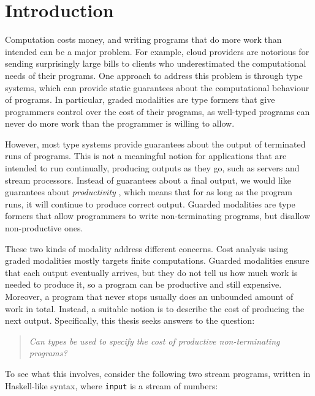 \chapter{Introduction}\label{chap:Introduction}
Computation costs money, and writing programs that do more work than intended can be a major problem. For example, cloud providers are
notorious for sending surprisingly large bills to clients who underestimated the computational needs of their programs.
One approach to address this problem is through type systems, which can provide static guarantees about the computational behaviour of programs.
In particular, graded modalities \citep{katsumata14, orchardQuantitativeProgramReasoning2019a} are type formers that give
programmers control over the cost of their programs, as well-typed programs can never do more work than the programmer is willing to allow.

However, most type systems provide guarantees about the output of terminated runs of programs. This is not a meaningful notion for
applications that are intended to run continually, producing outputs as they go, such as servers and stream processors.
Instead of guarantees about a final output, we would like guarantees about \emph{productivity} \citep{atkeyProductiveCoprogrammingGuarded2013a},
which means that for as long as the program runs, it will continue to produce correct output.
Guarded modalities \citep{nakanoModalityRecursion2000, cloustonGuardedLambdaCalculusProgramming2017a} are type formers that allow programmers
to write non-terminating programs, but disallow non-productive ones.

These two kinds of modality address different concerns. Cost analysis using graded modalities mostly targets finite computations.
Guarded modalities ensure that each output eventually arrives, but they do not tell us how much
work is needed to produce it, so a program can be productive and still expensive. Moreover, a program that never stops usually does an
unbounded amount of work in total. Instead, a suitable notion is to describe the cost of producing
the next output. Specifically, this thesis seeks answers to the question:
\begin{quote}
  \emph{Can types be used to specify the cost of productive non-terminating programs?}
\end{quote}

To see what this involves, consider the following two stream programs, written in Haskell-like syntax, 
where \texttt{input} is a stream of numbers:

